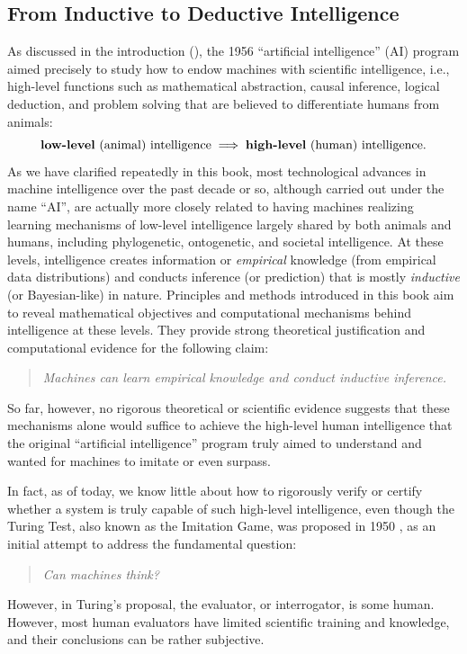 \documentclass[../../book-main.tex]{subfiles}
\begin{document}
\subsection{From Inductive to Deductive Intelligence}
As discussed in the introduction (), the 1956
``artificial intelligence'' (AI) program aimed precisely to study how
to endow machines with scientific intelligence, i.e., high-level
functions such as mathematical abstraction, causal inference, logical deduction, and
problem solving that are believed to differentiate humans from animals:
\begin{equation}
    \text{\textbf{low-level} (animal) intelligence} \; \Longrightarrow \;
    \text{\textbf{high-level} (human) intelligence.}
\end{equation}
As we have clarified repeatedly in this book, most technological
advances in machine intelligence over the past decade or so, although
carried out under the name ``AI'', are actually more closely related
to having machines realizing learning mechanisms of low-level intelligence 
largely shared by both animals and humans, including phylogenetic,
ontogenetic, and societal intelligence. At these levels, intelligence
creates information or \textit{empirical} knowledge (from empirical data 
distributions) and conducts inference (or prediction) that is mostly 
\textit{inductive} (or Bayesian-like) in nature. Principles and methods 
introduced in this book aim to reveal mathematical objectives and computational 
mechanisms behind intelligence at these levels. They provide strong 
theoretical justification and computational evidence for the following claim:
\begin{quote}
    \centering
    \textit{Machines can learn empirical knowledge and conduct
    inductive inference.}
\end{quote}
So far, however, no rigorous theoretical or scientific evidence
suggests that these mechanisms alone would suffice to achieve the
high-level human intelligence that the original ``artificial intelligence'' program 
truly aimed to understand and wanted for machines to imitate or even surpass.

In fact, as of today, we know little about how to rigorously verify
or certify whether a system is truly capable of such high-level
intelligence, even though the Turing Test, also known as the
Imitation Game, was proposed in 1950 \citep{Turing-1950}, as an initial
attempt to address the fundamental question:
\begin{quote}
    \centering
    \textit{Can machines think?}
\end{quote}
However, in Turing's proposal, the evaluator, or interrogator, 
is some human. However, most human evaluators have limited scientific 
training and knowledge, and their conclusions can be rather subjective. 
\end{document}
